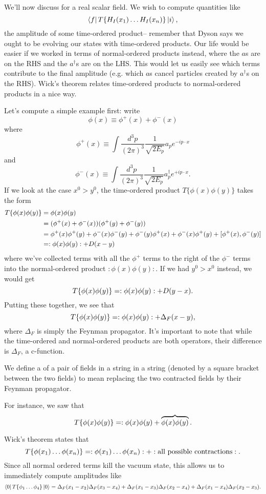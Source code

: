We'll now discuss  for a real scalar field. We wish to compute quantities like
$$\left< f \right|T\{H_I(x_1)\ldots H_I(x_n)\}\left| i \right>,$$
the amplitude of some time-ordered product-- remember that Dyson says we ought to be evolving our states with time-ordered products. Our life would be easier if we worked in terms of normal-ordered products instead, where the $a$s are on the RHS and the $a^\dagger$s are on the LHS. This would let us easily see which terms contribute to the final amplitude (e.g. which $a$s cancel particles created by $a^\dagger$s on the RHS). Wick's theorem relates time-ordered products to normal-ordered products in a nice way.

Let's compute a simple example first: write
$$\phi(x)\equiv \phi^+(x)+\phi^-(x)$$
where
$$\phi^+ (x)\equiv \int \frac{d^3p}{(2\pi)^3}\frac{1}{\sqrt{2E_p}} a_p e^{-ip\cdot x}$$
and
$$\phi^-(x)\equiv \int \frac{d^3p}{(2\pi)^3}\frac{1}{\sqrt{2E_p}} a_p^\dagger e^{+ip\cdot x}.$$
If we look at the case $x^0>y^0$, the time-ordered product $T\{\phi(x)\phi(y)\}$ takes the form
\begin{align*}
T\{\phi(x)\phi(y)\}&=\phi(x)\phi(y)\\
&=(\phi^+(x)+\phi^-(x))(\phi^+(y)+\phi^-(y))\\
&=\phi^+(x)\phi^+(y)+\phi^-(x)\phi^-(y)+\phi^-(y)\phi^+(x)+\phi^-(x)\phi^+(y)+[\phi^+(x),\phi^-(y)]\\
&=:\phi(x)\phi(y):+D(x-y)
\end{align*}
where we've collected terms with all the $\phi^+$ terms to the right of the $\phi^-$ terms into the normal-ordered product $:\phi(x)\phi(y):$. If we had $y^0>x^0$ instead, we would get
$$T\{\phi(x)\phi(y)\}=:\phi(x)\phi(y):+D(y-x).$$
Putting these together, we see that
$$T\{\phi(x)\phi(y)\}=:\phi(x)\phi(y):+\Delta_F(x-y),$$
where $\Delta_F$ is simply the Feynman propagator. It's important to note that while the time-ordered and normal-ordered products are both operators, their difference is $\Delta_F$, a c-function.

\begin{defn}
We define a  of a pair of fields in a string in a string (denoted by a square bracket between the two fields) to mean replacing the two contracted fields by their Feynman propagator.

For instance, we saw that
$$T\{\phi(x)\phi(y)\}=:\phi(x)\phi(y)+\overbrace{\phi(x)\phi(y)}.$$
\end{defn}

Wick's theorem states that
$$T\{\phi(x_1)\ldots \phi(x_n)\}=:\phi(x_1)\ldots \phi(x_n):+:\text{all possible contractions}:.$$
Since all normal ordered terms kill the vacuum state, this allows us to immediately compute amplitudes like
$$\left< 0 \right|T\{\phi_1\ldots \phi_4\}\left| 0 \right>=\Delta_F (x_1-x_2)\Delta_F(x_3-x_4)+\Delta_F(x_1-x_3)\Delta_F(x_2-x_4)+\Delta_F(x_1-x_4)\Delta_F(x_2-x_3).$$

